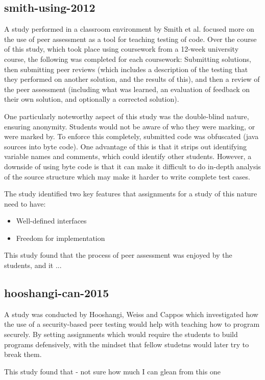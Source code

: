 \documentclass[a4paper,11pt]{report}
\begin{document}
\subsection{smith-using-2012}
A study performed in a classroom environment by Smith et al.\cite{smith_using_2012} focused more on the use of peer assessment as a tool for teaching testing of code. Over the course of this study, which took place using coursework from a 12-week university course, the following was completed for each coursework: Submitting solutions, then submitting peer reviews (which includes a description of the testing that they performed on another solution, and the results of this), and then a review of the peer assessment (including what was learned, an evaluation of feedback on their own solution, and optionally a corrected solution).\par
One particularly noteworthy aspect of this study was the double-blind nature, ensuring anonymity. Students would not be aware of who they were marking, or were marked by. To enforce this completely, submitted code was obfuscated (java sources into byte code). One advantage of this is that it strips out identifying variable names and comments, which could identify other students. However, a downside of using byte code is that it can make it difficult to do in-depth analysis of the source structure which may make it harder to write complete test cases.\par %
The study identified two key features that assignments for a study of this nature need to have:
\begin{itemize}
 \item Well-defined interfaces
 \item Freedom for implementation
\end{itemize}
This study found that the process of peer assessment was enjoyed by the students, and it ... %

\subsection{hooshangi-can-2015}
A study was conducted by Hooshangi, Weiss and Cappos \cite{hooshangi_can_2015} which investigated how the use of a security-based peer testing would help with teaching how to program securely. By setting assignments which would require the students to build programs defensively, with the mindset that fellow studetns would later try to break them.\par
This study found that  - not sure how much I can glean from this one
\end{document}
